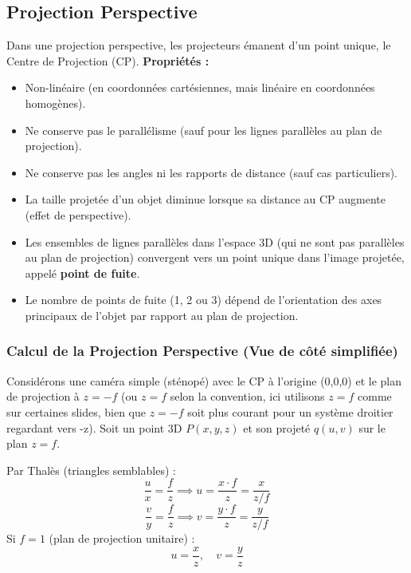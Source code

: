 \documentclass{article}
\begin{document}
\subsection{Projection Perspective}
Dans une projection perspective, les projecteurs émanent d'un point unique, le Centre de Projection (CP).
\textbf{Propriétés :}
\begin{itemize}
    \item Non-linéaire (en coordonnées cartésiennes, mais linéaire en coordonnées homogènes).
    \item Ne conserve pas le parallélisme (sauf pour les lignes parallèles au plan de projection).
    \item Ne conserve pas les angles ni les rapports de distance (sauf cas particuliers).
    \item La taille projetée d'un objet diminue lorsque sa distance au CP augmente (effet de perspective).
    \item Les ensembles de lignes parallèles dans l'espace 3D (qui ne sont pas parallèles au plan de projection) convergent vers un point unique dans l'image projetée, appelé \textbf{point de fuite}.
    \item Le nombre de points de fuite (1, 2 ou 3) dépend de l'orientation des axes principaux de l'objet par rapport au plan de projection.
\end{itemize}

\subsubsection{Calcul de la Projection Perspective (Vue de côté simplifiée)}
Considérons une caméra simple (sténopé) avec le CP à l'origine (0,0,0) et le plan de projection à $z = -f$ (ou $z=f$ selon la convention, ici utilisons $z=f$ comme sur certaines slides, bien que $z=-f$ soit plus courant pour un système droitier regardant vers -z). Soit un point 3D $P(x, y, z)$ et son projeté $q(u, v)$ sur le plan $z=f$.

Par Thalès (triangles semblables) :
\[ \frac{u}{x} = \frac{f}{z} \implies u = \frac{x \cdot f}{z} = \frac{x}{z/f} \]
\[ \frac{v}{y} = \frac{f}{z} \implies v = \frac{y \cdot f}{z} = \frac{y}{z/f} \]
Si $f=1$ (plan de projection unitaire) :
\[ u = \frac{x}{z}, \quad v = \frac{y}{z} \]
\end{document}
